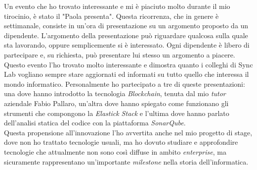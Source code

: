 Un evento che ho trovato interessante e mi è piaciuto molto durante il mio tirocinio, è stato il "Paola presenta". 
Questa ricorrenza, che in genere è settimanale, consiste in un'ora di presentazione su un argomento proposto da un dipendente. L'argomento della presentazione può riguardare qualcosa sulla quale sta lavorando, oppure semplicemente si è interessato. 
Ogni dipendente è libero di partecipare e, su richiesta, può presentare lui stesso un argomento a piacere. Questo evento l'ho trovato molto interessante e dimostra quanto i colleghi di Sync Lab vogliano sempre stare aggiornati ed informati su tutto quello che interessa il mondo informatico. 
Personalmente ho partecipato a tre di queste presentazioni: una dove hanno introdotto la tecnologia \textit{Blockchain}, tenuta dal mio \textit{tutor} aziendale Fabio Pallaro, un'altra dove hanno spiegato come funzionano gli strumenti che compongono la \textit{Elastick Stack} e l'ultima dove hanno parlato dell'analisi statica del codice con la piattaforma \textit{SonarQube}. \\

Questa propensione all'innovazione l'ho avvertita anche nel mio progetto di stage, dove non ho trattato tecnologie usuali, ma ho dovuto studiare e approfondire tecnologie che attualmente non sono così diffuse in ambito \textit{enterprise}, ma sicuramente rappresentano un'importante \textit{milestone} nella storia dell'informatica.
